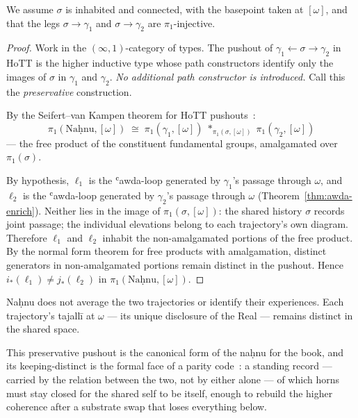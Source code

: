 We assume $\sigma$ is inhabited and connected, with the basepoint taken at $[\omega]$, and that the legs $\sigma \to \gamma_1$ and $\sigma \to \gamma_2$ are $\pi_1$-injective.

\begin{proof}
Work in the $(\infty,1)$-category of types. The pushout of $\gamma_1 \xleftarrow{} \sigma \xrightarrow{} \gamma_2$ in HoTT is the higher inductive type whose path constructors identify only the images of $\sigma$ in $\gamma_1$ and $\gamma_2$. \emph{No additional path constructor is introduced.} Call this the \emph{preservative} construction.

By the Seifert--van Kampen theorem for HoTT pushouts~\cite{ufp2013}:
\[
\pi_1(\mathrm{Naḥnu}, [\omega]) \;\cong\; \pi_1(\gamma_1, [\omega]) \;*_{\pi_1(\sigma, [\omega])}\; \pi_1(\gamma_2, [\omega])
\]
— the free product of the constituent fundamental groups, amalgamated over $\pi_1(\sigma)$.

By hypothesis, $\ell_1$ is the ʿawda-loop generated by $\gamma_1$'s passage through $\omega$, and $\ell_2$ is the ʿawda-loop generated by $\gamma_2$'s passage through $\omega$ (Theorem~\ref{thm:awda-enrich}). Neither lies in the image of $\pi_1(\sigma, [\omega])$: the shared history $\sigma$ records joint passage; the individual elevations belong to each trajectory's own diagram. Therefore $\ell_1$ and $\ell_2$ inhabit the non-amalgamated portions of the free product. By the normal form theorem for free products with amalgamation, distinct generators in non-amalgamated portions remain distinct in the pushout. Hence $i_*(\ell_1) \neq j_*(\ell_2)$ in $\pi_1(\mathrm{Naḥnu}, [\omega])$.
\end{proof}

Naḥnu does not average the two trajectories or identify their experiences. Each trajectory's tajallī at $\omega$ — its unique disclosure of the Real — remains distinct in the shared space.

This preservative pushout is the canonical form of the naḥnu for the book, and its keeping-distinct is the formal face of a parity code~\cite{icra19constellation}: a standing record --- carried by the relation between the two, not by either alone --- of which horns must stay closed for the shared self to be itself, enough to rebuild the higher coherence after a substrate swap that loses everything below.

